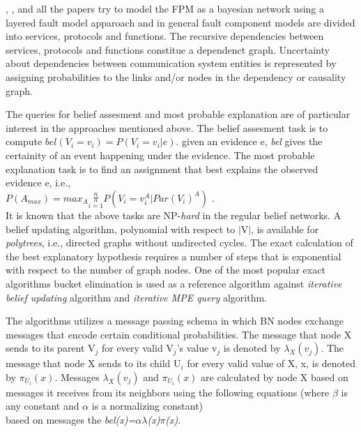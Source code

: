\documentclass[10pt]{sigplan-proc-varsize}
\begin{document}
\cite{Cynthia:97}, \cite{Sethi:02}, \cite{Sethi:041} and \cite{Sethi:04} all the papers try to model the FPM as a bayesian network using a layered fault model apparoach and in general fault component models are divided into services, protocols and functions. The recursive dependencies between services, protocols and functions constitue a dependenct graph. Uncertainty about dependencies between communication system entities is represented by assigning probabilities to the links and/or nodes in the dependency or causality graph. 

The queries for belief assesment and most probable explanation are of particular interest in the approaches mentioned above. The belief assesment task is to compute $bel(V_i=v_i) = P(V_i=v_i|e)$. given an evidence e, {\it bel}  gives the certainity of an event happening under the evidence. The most probable explanation task is to find an assignment that best explains the observed evidence e, i.e.,  \\
$P(A_{max}) = max_A \underset{i=1}{\overset{n}{\pi}} P(V_i=v_i^A | Par(V_i)^A)$ \cite{Pearl:98}. \\
It is known that the above tasks are NP-{\it hard} in the regular belief networks. A belief updating algorithm, polynomial with respect to $|$V$|$, is available for {\it polytrees}, i.e., directed graphs without undirected cycles. The exact calculation of the best explanatory hypothesis requires a number of steps that is exponential with respect to the number of graph nodes. One of the most popular exact algorithms bucket elimination is used as a reference algorithm against {\it iterative belief updating} algorithm and {\it iterative MPE query} algorithm.

The algorithms  utilizes a message passing schema in which BN nodes exchange messages that encode certain conditional probabilities. The message that node X sends to its parent V$_j$ for every valid V$_j$'s value v$_j$ is denoted by ${\lambda}_X(v_j)$. The message that node X sends to its child U$_i$ for every valid value of X, x, is denoted by ${\pi}_{U_i}(x)$. Messages ${\lambda}_X(v_j)$ and ${\pi}_{U_i}(x)$ are calculated by node X based on messages it receives from its neighbors using the following equations (where $\beta$ is any constant and $\alpha$ is a normalizing constant)
\\
based on messages the {\it bel(x)={$\alpha$}{$\lambda$}(x){$\pi$}(x)}.
\end{document}
